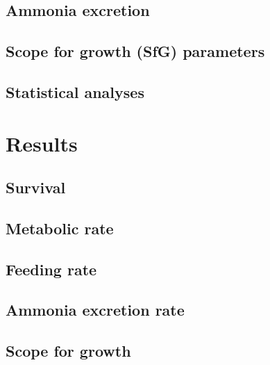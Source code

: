 \documentclass[
  oneside, 11pt, a4paper]{memoir}
\begin{document}
\hypertarget{ammonia-excretion}{%
\subsection{Ammonia excretion}\label{ammonia-excretion}}

\hypertarget{scope-for-growth-sfg-parameters}{%
\subsection{Scope for growth (SfG) parameters}\label{scope-for-growth-sfg-parameters}}

\hypertarget{statistical-analyses}{%
\subsection{Statistical analyses}\label{statistical-analyses}}

\hypertarget{results-1}{%
\section{Results}\label{results-1}}

\hypertarget{survival-2}{%
\subsection{Survival}\label{survival-2}}

\hypertarget{metabolic-rate-3}{%
\subsection{Metabolic rate}\label{metabolic-rate-3}}

\hypertarget{feeding-rate}{%
\subsection{Feeding rate}\label{feeding-rate}}

\hypertarget{ammonia-excretion-rate}{%
\subsection{Ammonia excretion rate}\label{ammonia-excretion-rate}}

\hypertarget{scope-for-growth}{%
\subsection{Scope for growth}\label{scope-for-growth}}
\end{document}
